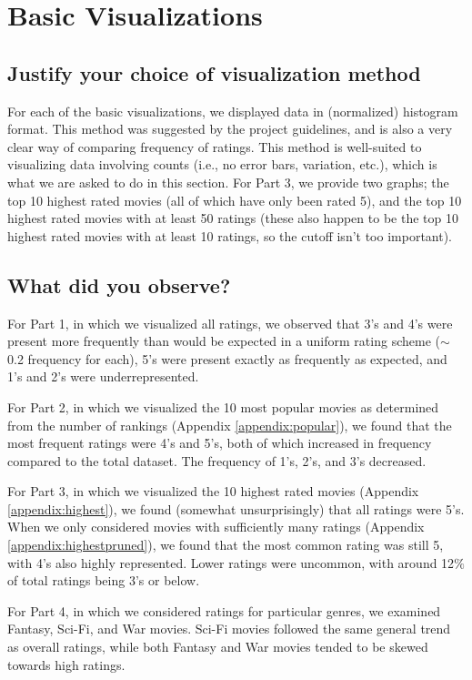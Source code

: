 \section{Basic Visualizations}
\medskip
\subsection*{Justify your choice of visualization method}
For each of the basic visualizations, we displayed data in (normalized) histogram format. This method was suggested by the project guidelines, and is also a very clear way of comparing frequency of ratings. This method is well-suited to visualizing data involving counts (i.e., no error bars, variation, etc.), which is what we are asked to do in this section. For Part 3, we provide two graphs; the top 10 highest rated movies (all of which have only been rated 5), and the top 10 highest rated movies with at least 50 ratings (these also happen to be the top 10 highest rated movies with at least 10 ratings, so the cutoff isn't too important).
\smallskip
\subsection*{What did you observe?}
For Part 1, in which we visualized all ratings, we observed that 3's and 4's were present more frequently than would be expected in a uniform rating scheme ($\sim$ 0.2 frequency for each), 5's were present exactly as frequently as expected, and 1's and 2's were underrepresented.

For Part 2, in which we visualized the 10 most popular movies as determined from the number of rankings (Appendix \ref{appendix:popular}), we found that the most frequent ratings were 4's and 5's, both of which increased in frequency compared to the total dataset. The frequency of 1's, 2's, and 3's decreased.

For Part 3, in which we visualized the 10 highest rated movies (Appendix \ref{appendix:highest}), we found (somewhat unsurprisingly) that all ratings were 5's. When we only considered movies with sufficiently many ratings (Appendix \ref{appendix:highestpruned}), we found that the most common rating was still 5, with 4's also highly represented. Lower ratings were uncommon, with around 12$\%$ of total ratings being 3's or below.

For Part 4, in which we considered ratings for particular genres, we examined Fantasy, Sci-Fi, and War movies. Sci-Fi movies followed the same general trend as overall ratings, while both Fantasy and War movies tended to be skewed towards high ratings.
\smallskip
